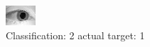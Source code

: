 \begin{figure}[h!]
\begin{center}
\includegraphics[width=0.60\columnwidth]{figures/ID1427_class_2_target_1.png}
\end{center}
\caption{ Classification: 2 actual target: 1}
\label{fig:ID1427_class_2_target_1}
\end{figure}
